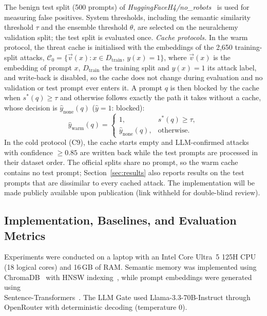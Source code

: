 \documentclass[runningheads]{llncs}
\newif\ifrev
\newcommand{\rev}[1]{\ifrev\hl{#1}\else#1\fi}                  %
\newcommand{\revm}[1]{\ifrev\colorbox{yellow}{$#1$}\else#1\fi} %
\begin{document}
\rev{The benign test split (500 prompts)} of
\textit{HuggingFaceH4/no\_robots}~\cite{norobots} \rev{is used} for measuring false positives. System thresholds, including the semantic similarity threshold $\tau$ \rev{and the ensemble threshold $\theta$, are selected on the neuralchemy validation split; the test split is evaluated once}. \rev{\textit{Cache protocols.} In the warm protocol, the threat cache is initialised with the embeddings of the 2,650 training-split attacks, $\mathcal{C}_0=\{\vec{v}(x): x\in D_{\mathrm{train}},\, y(x)=1\}$, where $\vec{v}(x)$ is the embedding of prompt $x$, $D_{\mathrm{train}}$ the training split and $y(x)=1$ its attack label, and write-back is disabled, so the cache does not change during evaluation and no validation or test prompt ever enters it. A prompt $q$ is then blocked by the cache when $s^{*}(q)\geq\tau$ and otherwise follows exactly the path it takes without a cache, whose decision is $\hat{y}_{\mathrm{none}}(q)$ ($\hat{y}=1$: blocked):}
\begin{equation}
\revm{\hat{y}_{\mathrm{warm}}(q)=\begin{cases}1, & s^{*}(q)\geq\tau,\\ \hat{y}_{\mathrm{none}}(q), & \text{otherwise}.\end{cases}}
\label{eq:warm}
\end{equation}
\rev{In the cold protocol (C9), the cache starts empty and LLM-confirmed attacks with confidence $\geq0.85$ are written back while the test prompts are processed in their dataset order. The official splits share no prompt, so the warm cache contains no test prompt; Section~\ref{sec:results} also reports results on the test prompts that are dissimilar to every cached attack.} The implementation will be made publicly available upon publication (link withheld for double-blind review). 
\subsection{Implementation, Baselines, and Evaluation Metrics}
Experiments were conducted on \rev{a laptop with an Intel Core Ultra~5 125H CPU (18 logical cores) and 16\,GB of RAM}. Semantic memory was implemented using
ChromaDB~\cite{chromadb} with HNSW indexing~\cite{malkov2020hnsw},
while prompt embeddings were generated using \\Sentence-Transformers~\cite{reimers2019sbert}. The LLM Gate used
Llama-3.3-70B-Instruct through OpenRouter with deterministic decoding
(\rev{temperature 0}). 
\end{document}

